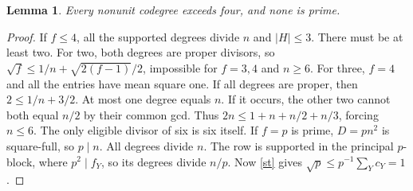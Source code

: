 \documentclass[11pt]{amsart}
\numberwithin{equation}{section}
\newtheorem{lemma}[theorem]{Lemma}
\begin{document}
\begin{lemma}\label{small}
Every nonunit codegree exceeds four, and none is prime.
\end{lemma}
\begin{proof}
If $f\le4$, all the supported degrees divide $n$ and $|H|\le3$.
There must be at least two. For two, both degrees are proper divisors,
so $\sqrt f\le1/n+\sqrt{2(f-1)}/2$, impossible for $f=3,4$
and $n\ge6$. For three, $f=4$ and all the entries have mean square
one. If all degrees are proper, then $2\le1/n+3/2$. At most one degree equals $n$. If it occurs, the other two
cannot both equal $n/2$ by their common gcd. Thus
$2n\le1+n+n/2+n/3$, forcing $n\le6$. The only eligible divisor
of six is six itself.
If $f=p$ is prime, $D=pn^2$ is square-full, so $p\mid n$. All
degrees divide $n$. The row is supported in the principal $p$-block,
where $p^2\mid f_Y$, so its degrees divide $n/p$. Now
\eqref{st} gives $\sqrt p\le p^{-1}\sum_Y c_Y=1$.
\end{proof}
\end{document}
